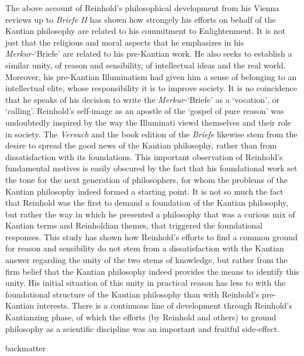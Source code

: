 The above account of Reinhold's philosophical development from his Vienna reviews up to \textit{Briefe II} has shown how strongely his efforts on behalf of the Kantian philosophy are related to his commitment to Enlightenment. It is not just that the religious and moral aspects that he emphasizes in his \textit{Merkur{-}}`Briefe' are related to his pre{-}Kantian work. He also seeks to establish a similar unity, of reason and sensibility, of intellectual ideas and the real world. Moreover, his pre{-}Kantian Illuminatism had given him a sense of belonging to an intellectual elite, whose responsibility it is to improve society. It is no coincidence that he speaks of his decision to write the \textit{Merkur{-}}`Briefe' as a `vocation', or `calling'. Reinhold's self{-}image as an apostle of the `gospel of pure reason' was undoubtedly inspired by the way the Illuminati viewd themselves and their role in society. The \textit{Versuch} and the book edition of the \textit{Briefe} likewise stem from the desire to spread the good news of the Kantian philosophy, rather than from dissatisfaction with its foundations. This important observation of Reinhold's fundamental motives is easily obscured by the fact that his foundational work set the tone for the next generation of philosophers, for whom the problems of the Kantian philosophy indeed formed a starting point. It is not so much the fact that Reinhold was the first to demand a foundation of the Kantian philosophy, but rather the way in which he presented a philosophy that was a curious mix of Kantian terms and Reinholdian themes, that triggered the foundational responses. This study has shown how Reinhold's efforts to find a common ground for reason and sensibility do not stem from a dissatisfaction with the Kantian answer regarding the unity of the two stems of knowledge, but rather from the firm belief that the Kantian philosophy indeed provides the means to identify this unity. His initial situation of this unity in practical reason has less to with the foundational structure of the Kantian philosophy than with Reinhold's pre{-}Kantian interests. There is a continuous line of development through Reinhold's Kantianzing phase, of which the efforts (by Reinhold and others) to ground philosophy as a scientific discipline was an important and fruitful side{-}effect.

backmatter

